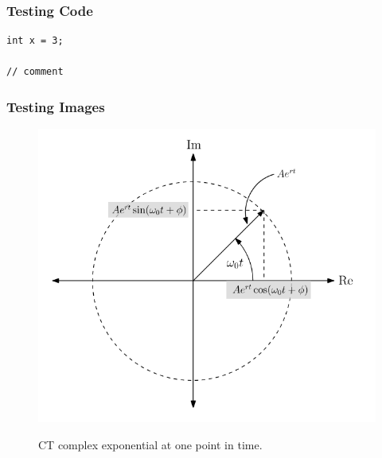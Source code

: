 \documentclass{beamer}
\begin{document}
\begin{frame}
  \frametitle{Testing Code}

\begin{verbatim}
int x = 3;

// comment
\end{verbatim}

\end{frame}

\begin{frame}
  \frametitle{Testing Images}
  \begin{figure}
    \centering
    \includegraphics[width=0.4\linewidth, alt={CT complex exponential at one point in time}]{testimage.png}
    \caption{CT complex exponential at one point in time.}
  \end{figure}

\end{frame}
\end{document}
